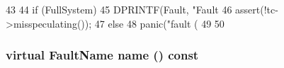 \begin{DoxyCode}
43 {
44     if (FullSystem) {
45         DPRINTF(Fault, "Fault %
46         assert(!tc->misspeculating());
47     } else {
48         panic("fault (%
49     }
50 }
\end{DoxyCode}
\hypertarget{classFaultBase_aad960357563b8b969d2dffdcc6861de7}{
\subsubsection[{name}]{\setlength{\rightskip}{0pt plus 5cm}virtual {\bf FaultName} name () const}}
\label{classFaultBase_aad960357563b8b969d2dffdcc6861de7}


